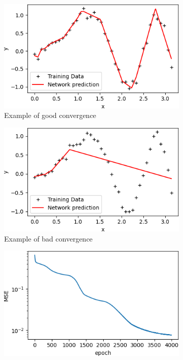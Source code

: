\begin{figure}[p]
     \begin{subfigure}[b]{0.49\textwidth}
         \centering
         \includegraphics[width=\textwidth]{adamgood}
         \caption{Example of good convergence}
         \label{adamgood}
     \end{subfigure}
     \begin{subfigure}[b]{0.49\textwidth}
         \centering
         \includegraphics[width=\textwidth]{adambad}
         \caption{Example of bad convergence}
         \label{adambad}
     \end{subfigure}
     \begin{subfigure}[b]{0.49\textwidth}
         \centering
         \includegraphics[width=\textwidth]{adamgoodconv}

\end{subfigure}
\end{figure}
